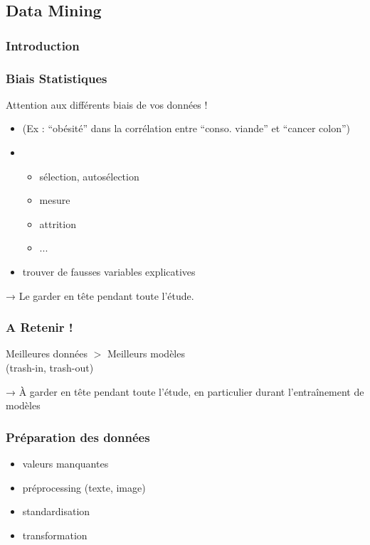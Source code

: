 \subsection{Data Mining}

\begin{frame}
  \frametitle{Introduction}
\end{frame}


\begin{frame}
  \frametitle{Biais Statistiques}
  Attention aux différents biais de vos données !
  \begin{itemize}[<+->]
  \item {} (Ex : ``obésité'' dans la corrélation entre ``conso. viande'' et ``cancer colon'')
  \item {}
    \begin{itemize}[<+->]
    \item sélection, autosélection
    \item mesure
    \item attrition
    \item ...
    \end{itemize}
  \item trouver de fausses variables explicatives
  \end{itemize}
  \pause
  → Le garder en tête pendant toute l'étude.
\end{frame}

\begin{frame}
  \frametitle{A Retenir !}
  \begin{center}
    Meilleures données $>$ Meilleurs modèles \\
    (trash-in, trash-out) \\
  \end{center}
  → À garder en tête pendant toute l'étude, en particulier durant
  l'entraînement de modèles
\end{frame}

\begin{frame}
  \frametitle{Préparation des données}
  \begin{itemize}
  \item valeurs manquantes
  \item préprocessing (texte, image)
  \item standardisation
  \item transformation
  \end{itemize}
\end{frame}

